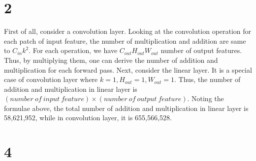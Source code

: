 \documentclass[10pt]{article}
\begin{document}
\section*{2}
First of all, consider a convolution layer. 
Looking at the convolution operation for each patch of input feature, the number of multiplication and 
addition are same to $C_{in}k^2$. For each operation, we have $C_{out}H_{out}W_{out}$ number of output features.
Thus, by multiplying them, one can derive the number of addition and multiplication for each forward pass. 
Next, consider the linear layer. It is a special case of convolution layer where $k = 1, H_{out} = 1, W_{out} = 1$. Thus, 
the number of addition and multiplication in linear layer is $(number\ of\ input\ feature)\times(number\ of\ output\ feature)$.
Noting the formulae above, the total number of addition and multiplication in linear layer is 58,621,952, while in convolution layer, it is 655,566,528.

\section*{4}
\end{document}
